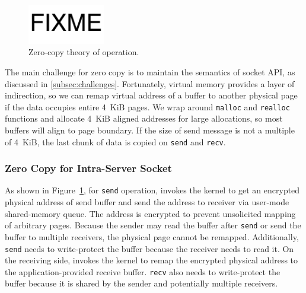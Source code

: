 \begin{figure}[t]
	\centering
	\includegraphics[width=0.3\textwidth]{images/fixme}
	\caption{Zero-copy theory of operation.}
	\label{fig:zerocopy}
\end{figure}

The main challenge for zero copy is to maintain the semantics of socket API, as discussed in \ref{subsec:challenges}.
Fortunately, virtual memory provides a layer of indirection, so we can remap virtual address of a buffer to another physical page if the data occupies entire 4~KiB pages.
We wrap around \texttt{malloc} and \texttt{realloc} functions and allocate 4~KiB aligned addresses for large allocations, so most buffers will align to page boundary.
If the size of send message is not a multiple of 4~KiB, the last chunk of data is copied on \texttt{send} and \texttt{recv}.

\subsubsection{Zero Copy for Intra-Server Socket}
\label{subsec:zero-copy-intra}

As shown in Figure~\ref{fig:zerocopy}, for \texttt{send} operation, \libipc{} invokes the kernel to get an encrypted physical address of send buffer and send the address to receiver via user-mode shared-memory queue.
The address is encrypted to prevent unsolicited mapping of arbitrary pages.
Because the sender may read the buffer after \texttt{send} or send the buffer to multiple receivers, the physical page cannot be remapped.
Additionally, \texttt{send} needs to write-protect the buffer because the receiver needs to read it.
On the receiving side, \libipc{} invokes the kernel to remap the encrypted physical address to the application-provided receive buffer.
\texttt{recv} also needs to write-protect the buffer because it is shared by the sender and potentially multiple receivers.


